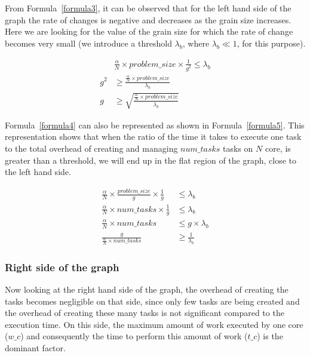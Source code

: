 From Formula~\ref{formula3}, it can be observed that for the left hand side of the graph the rate of changes is negative and decreases as the grain size increases. Here we are looking for the value of the grain size for which the rate of change becomes very small (we introduce a threshold $\lambda_b$, where $\lambda_b\ll1$, for this purpose). 


\begin{equation}\label{formula4}
\begin{aligned}
&\frac{\alpha}{N}\times{problem\_{size}}\times{\frac{1}{g^2}}\leq{\lambda_b} \\
{g^2}&\geq{\frac{\frac{\alpha}{N}\times{problem\_{size}}}{\lambda_b}}\\
{g}&\geq{\sqrt{\frac{\frac{\alpha}{N}\times{problem\_{size}}}{\lambda_b}}}
\end{aligned}
\end{equation}

Formula~\ref{formula4} can also be represented as shown in Formula~\ref{formula5}. This representation shows that when the ratio of the time it takes to execute one task to the total overhead of creating and managing $num\_{tasks}$ tasks on $N$ core, is greater than a threshold, we will end up in the flat region of the graph, close to the left hand side.


\begin{equation}\label{formula5}
\begin{aligned}
\frac{\alpha}{N}\times{\frac{problem\_{size}}{g}}\times{\frac{1}{g}}&\leq{\lambda_b}\\
\frac{\alpha}{N}\times{num\_{tasks}}\times{\frac{1}{g}}&\leq{\lambda_b}\\
\frac{\alpha}{N}\times{num\_{tasks}}&\leq{g\times\lambda_b}\\	
\frac{g}{\frac{\alpha}{N}\times{num\_{tasks}}}&\geq{\frac{1}{\lambda_b}}
\end{aligned}
\end{equation}


\subsubsection{Right side of the graph}
Now looking at the right hand side of the graph, the overhead of creating the tasks becomes negligible on that side, since only few tasks are being created and the overhead of creating these many tasks is not significant compared to the execution time. On this side, the maximum amount of work executed by one core ($w\_c$) and consequently the time to perform this amount of work ($t\_c$) is the dominant factor.

